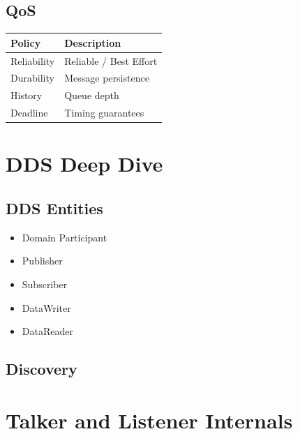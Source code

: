 \documentclass[11pt,oneside]{book}
\begin{document}
\chapter{QoS}

\begin{longtable}{|p{2in}|p{3in}|}
\hline
Policy & Description \\ \hline
Reliability & Reliable / Best Effort \\ \hline
Durability & Message persistence \\ \hline
History & Queue depth \\ \hline
Deadline & Timing guarantees \\ \hline
\end{longtable}

\part{DDS Deep Dive}

\chapter{DDS Entities}

\begin{itemize}
\item Domain Participant
\item Publisher
\item Subscriber
\item DataWriter
\item DataReader
\end{itemize}

\chapter{Discovery}

\begin{center}
\end{center}

\part{Talker and Listener Internals}
\end{document}
